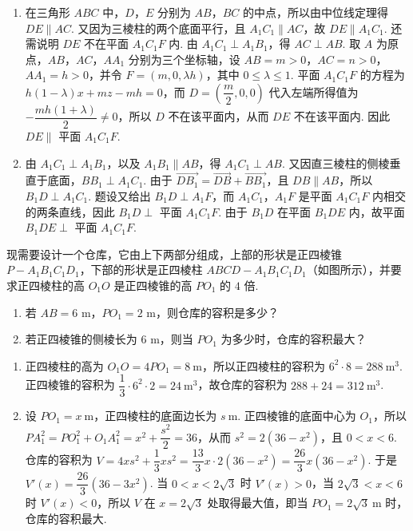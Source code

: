 \begin{solution}
\begin{enumerate}
\item 在三角形 \(ABC\) 中，\(D\)，\(E\) 分别为 \(AB\)，\(BC\) 的中点，所以由中位线定理得 \(DE\parallel AC\). 又因为三棱柱的两个底面平行，且 \(A_1C_1\parallel AC\)，故 \(DE\parallel A_1C_1\). 还需说明 \(DE\) 不在平面 \(A_1C_1F\) 内. 由 \(A_1C_1\perp A_1B_1\)，得 \(AC\perp AB\). 取 \(A\) 为原点，\(AB\)，\(AC\)，\(AA_1\) 分别为三个坐标轴，设 \(AB=m>0\)，\(AC=n>0\)，\(AA_1=h>0\)，并令 \(F=(m,0,\lambda h)\)，其中 \(0\le\lambda\le1\). 平面 \(A_1C_1F\) 的方程为 \(h(1-\lambda)x+mz-mh=0\)，而 \(D=\left(\dfrac m2,0,0\right)\) 代入左端所得值为 \(-\dfrac{mh(1+\lambda)}2\ne0\)，所以 \(D\) 不在该平面内，从而 \(DE\) 不在该平面内. 因此 \(DE\parallel\) 平面 \(A_1C_1F\).
\item 由 \(A_1C_1\perp A_1B_1\)，以及 \(A_1B_1\parallel AB\)，得 \(A_1C_1\perp AB\). 又因直三棱柱的侧棱垂直于底面，\(BB_1\perp A_1C_1\). 由于 \(\overrightarrow{DB_1}=\overrightarrow{DB}+\overrightarrow{BB_1}\)，且 \(DB\parallel AB\)，所以 \(B_1D\perp A_1C_1\). 题设又给出 \(B_1D\perp A_1F\)，而 \(A_1C_1\)，\(A_1F\) 是平面 \(A_1C_1F\) 内相交的两条直线，因此 \(B_1D\perp\) 平面 \(A_1C_1F\). 由于 \(B_1D\) 在平面 \(B_1DE\) 内，故平面 \(B_1DE\perp\) 平面 \(A_1C_1F\).
\end{enumerate}
\end{solution}

\begin{problem}
现需要设计一个仓库，它由上下两部分组成，上部的形状是正四棱锥 \(P-A_1B_1C_1D_1\)，下部的形状是正四棱柱 \(ABCD-A_1B_1C_1D_1\)（如图所示），并要求正四棱柱的高 \(O_1O\) 是正四棱锥的高 \(PO_1\) 的 \(4\) 倍.

\begin{enumerate}
\item 若 \(AB=6\text{ m}\)，\(PO_1=2\text{ m}\)，则仓库的容积是多少？
\item 若正四棱锥的侧棱长为 \(6\text{ m}\)，则当 \(PO_1\) 为多少时，仓库的容积最大？
\end{enumerate}

\end{problem}

\begin{solution}
\begin{enumerate}
\item 正四棱柱的高为 \(O_1O=4PO_1=8 \mathrm{~m}\)，所以正四棱柱的容积为 \(6^2\cdot8=288 \mathrm{~m}^3\). 正四棱锥的容积为 \(\dfrac13\cdot6^2\cdot2=24 \mathrm{~m}^3\)，故仓库的容积为 \(288+24=312 \mathrm{~m}^3\).
\item 设 \(PO_1=x \mathrm{~m}\)，正四棱柱的底面边长为 \(s \mathrm{~m}\). 正四棱锥的底面中心为 \(O_1\)，所以 \(PA_1^2=PO_1^2+O_1A_1^2=x^2+\dfrac{s^2}{2}=36\)，从而 \(s^2=2(36-x^2)\)，且 \(0<x<6\). 仓库的容积为 \(V=4xs^2+\dfrac13xs^2=\dfrac{13}{3}x\cdot2(36-x^2)=\dfrac{26}{3}x(36-x^2)\). 于是 \(V'(x)=\dfrac{26}{3}(36-3x^2)\). 当 \(0<x<2\sqrt3\) 时 \(V'(x)>0\)，当 \(2\sqrt3<x<6\) 时 \(V'(x)<0\)，所以 \(V\) 在 \(x=2\sqrt3\) 处取得最大值，即当 \(PO_1=2\sqrt3 \mathrm{~m}\) 时，仓库的容积最大.
\end{enumerate}
\end{solution}

